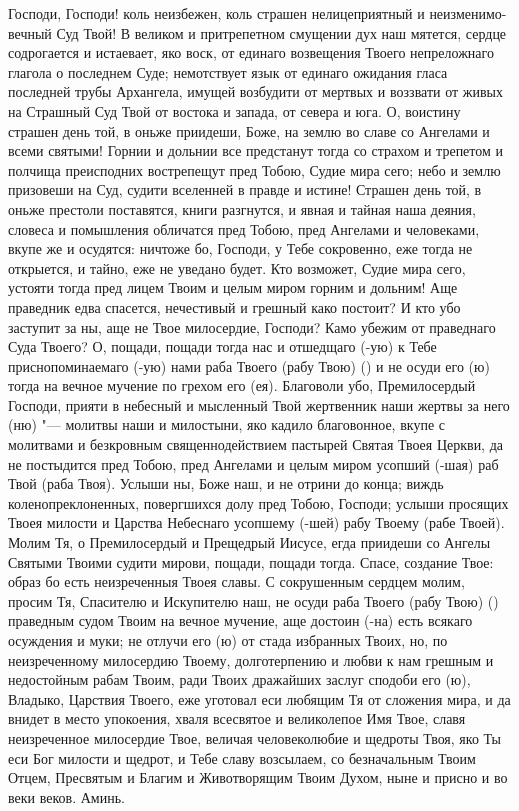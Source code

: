 \begin{mymulticols}
 


Господи, Господи! коль неизбежен, коль страшен нелицеприятный и неизменимо-вечный Суд Твой! В великом и притрепетном смущении дух наш мятется, сердце содрогается и истаевает, яко воск, от единаго возвещения Твоего непреложнаго глагола о последнем Суде; немотствует язык от единаго ожидания гласа последней трубы Архангела, имущей возбудити от мертвых и воззвати от живых на Страшный Суд Твой от востока и запада, от севера и юга. О, воистину страшен день той, в оньже приидеши, Боже, на землю во славе со Ангелами и всеми святыми! Горнии и дольнии все предстанут тогда со страхом и трепетом и полчища преисподних вострепещут пред Тобою, Судие мира сего; небо и землю призовеши на Суд, судити вселенней в правде и истине! Страшен день той, в оньже престоли поставятся, книги разгнутся, и явная и тайная наша деяния, словеса и помышления обличатся пред Тобою, пред Ангелами и человеками, вкупе же и осудятся: ничтоже бо, Господи, у Тебе сокровенно, еже тогда не открыется, и тайно, еже не уведано будет. Кто возможет, Судие мира сего, устояти тогда пред лицем Твоим и целым миром горним и дольним! Аще праведник едва спасется, нечестивый и грешный како постоит? И кто убо заступит за ны, аще не Твое милосердие, Господи? Камо убежим от праведнаго Суда Твоего? О, пощади, пощади тогда нас и отшедщаго (-ую) к Тебе приснопоминаемаго (-ую) нами раба Твоего (рабу Твою) () и не осуди его (ю) тогда на вечное мучение по грехом его (ея). Благоволи убо, Премилосердый Господи, прияти в небесный и мысленный Твой жертвенник наши жертвы за него (ню) "--- молитвы наши и милостыни, яко кадило благовонное, вкупе с молитвами и безкровным священнодействием пастырей Святая Твоея Церкви, да не постыдится пред Тобою, пред Ангелами и целым миром усопший (-шая) раб Твой (раба Твоя). Услыши ны, Боже наш, и не отрини до конца; виждь коленопреклоненных, повергшихся долу пред Тобою, Господи; услыши просящих Твоея милости и Царства Небеснаго усопшему (-шей) рабу Твоему (рабе Твоей). Молим Тя, о Премилосердый и Прещедрый Иисусе, егда приидеши со Ангелы Святыми Твоими судити мирови, пощади, пощади тогда. Спасе, создание Твое: образ бо есть неизреченныя Твоея славы. С сокрушенным сердцем молим, просим Тя, Спасителю и Искупителю наш, не осуди раба Твоего (рабу Твою) () праведным судом Твоим на вечное мучение, аще достоин (-на) есть всякаго осуждения и муки; не отлучи его (ю) от стада избранных Твоих, но, по неизреченному милосердию Твоему, долготерпению и любви к нам грешным и недостойным рабам Твоим, ради Твоих дражайших заслуг сподоби его (ю), Владыко, Царствия Твоего, еже уготовал еси любящим Тя от сложения мира, и да внидет в место упокоения, хваля всесвятое и великолепое Имя Твое, славя неизреченное милосердие Твое, величая человеколюбие и щедроты Твоя, яко Ты еси Бог милости и щедрот, и Тебе славу возсылаем, со безначальным Твоим Отцем, Пресвятым и Благим и Животворящим Твоим Духом, ныне и присно и во веки веков. Аминь. 

\end{mymulticols}

